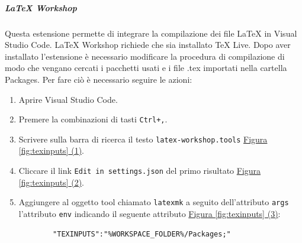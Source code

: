 \subparagraph{LaTeX Workshop}
Questa estensione permette di integrare la compilazione dei file LaTeX in Visual Studio Code.
LaTeX Workshop richiede che sia installato TeX Live.
Dopo aver installato l'estensione è necessario modificare la procedura di compilazione di modo che vengano cercati i pacchetti usati e i file .tex importati nella cartella Packages.
Per fare ciò è necessario seguire le azioni:
\begin{enumerate}
    \item Aprire Visual Studio Code.
    
    \item Premere la combinazioni di tasti \texttt{Ctrl+,}.
    
    \item Scrivere sulla barra di ricerca il testo \texttt{latex-workshop.tools} \hyperref[fig:texinputs]{Figura \ref{fig:texinputs} (1)}.
    
    \item Cliccare il link \texttt{Edit in settings.json} del primo risultato \hyperref[fig:texinputs]{Figura \ref{fig:texinputs} (2)}.
    
    \item Aggiungere al oggetto tool chiamato \texttt{latexmk} a seguito dell'attributo \texttt{args} l'attributo \texttt{env} indicando il seguente attributo \hyperref[fig:texinputs]{Figura \ref{fig:texinputs} (3)}: 
    \begin{lstlisting}
        "TEXINPUTS":"%WORKSPACE_FOLDER%/Packages;"
    \end{lstlisting}
\end{enumerate}

